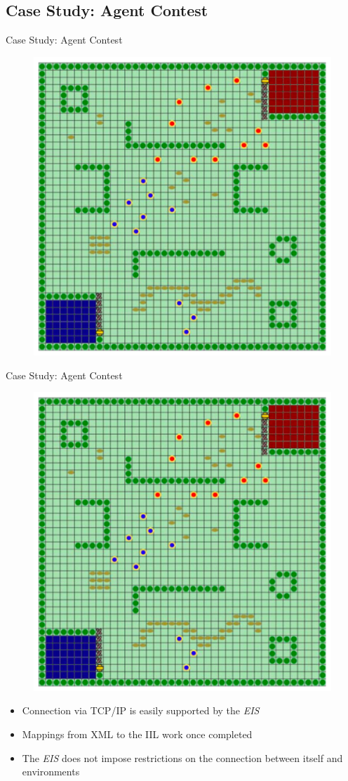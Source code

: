 \documentclass[t]{beamer}
\begin{document}
\subsection{Case Study: Agent Contest}
\begin{frame}{Case Study: Agent Contest}
	\begin{figure}
		\includegraphics[width=0.7\linewidth]{cowboys}
	\end{figure}
\end{frame}
\begin{frame}[noframenumbering]{Case Study: Agent Contest}
	\begin{figure}
		\includegraphics[width=0.45\linewidth]{cowboys}
	\end{figure}
	\begin{itemize}[<+->]
		\item Connection via TCP/IP is easily supported by the \emph{EIS}
		\item Mappings from XML to the IIL work once completed
		\item The \emph{EIS} does not impose restrictions on the connection between itself and environments
	\end{itemize}
\end{frame}
\end{document}
